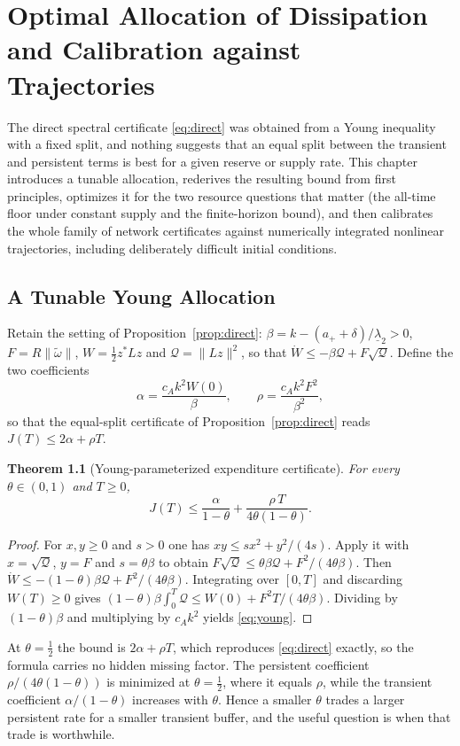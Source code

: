 \documentclass[11pt,notitlepage]{report}
\newtheorem{theorem}{Theorem}[chapter]
\theoremstyle{definition}
\theoremstyle{remark}
\begin{document}
\chapter{Optimal Allocation of Dissipation and Calibration against Trajectories}\label{ch:young}

The direct spectral certificate \eqref{eq:direct} was obtained from a Young inequality with a fixed split, and nothing suggests that an equal split between the transient and persistent terms is best for a given reserve or supply rate. This chapter introduces a tunable allocation, rederives the resulting bound from first principles, optimizes it for the two resource questions that matter (the all-time floor under constant supply and the finite-horizon bound), and then calibrates the whole family of network certificates against numerically integrated nonlinear trajectories, including deliberately difficult initial conditions.

\section{A Tunable Young Allocation}
Retain the setting of Proposition~\ref{prop:direct}: $\beta=k-(a_++\delta)/\underline\lambda_2>0$, $F=R\|\tilde\omega\|$, $W=\tfrac12z^*Lz$ and $\mathcal Q=\|Lz\|^2$, so that $\dot W\le-\beta\mathcal Q+F\sqrt{\mathcal Q}$. Define the two coefficients
\begin{equation}\label{eq:alpharho}
\alpha=\frac{c_Ak^2W(0)}{\beta},\qquad \rho=\frac{c_Ak^2F^2}{\beta^2},
\end{equation}
so that the equal-split certificate of Proposition~\ref{prop:direct} reads $J(T)\le2\alpha+\rho T$.
\begin{theorem}[Young-parameterized expenditure certificate]\label{th:young}
For every $\theta\in(0,1)$ and $T\ge0$,
\begin{equation}\label{eq:young}
J(T)\le\frac{\alpha}{1-\theta}+\frac{\rho\,T}{4\theta(1-\theta)}.
\end{equation}
\end{theorem}
\begin{proof}
For $x,y\ge0$ and $s>0$ one has $xy\le sx^2+y^2/(4s)$. Apply it with $x=\sqrt{\mathcal Q}$, $y=F$ and $s=\theta\beta$ to obtain $F\sqrt{\mathcal Q}\le\theta\beta\mathcal Q+F^2/(4\theta\beta)$. Then $\dot W\le-(1-\theta)\beta\mathcal Q+F^2/(4\theta\beta)$. Integrating over $[0,T]$ and discarding $W(T)\ge0$ gives $(1-\theta)\beta\int_0^T\mathcal Q\le W(0)+F^2T/(4\theta\beta)$. Dividing by $(1-\theta)\beta$ and multiplying by $c_Ak^2$ yields \eqref{eq:young}.
\end{proof}
At $\theta=\tfrac12$ the bound is $2\alpha+\rho T$, which reproduces \eqref{eq:direct} exactly, so the formula carries no hidden missing factor. The persistent coefficient $\rho/(4\theta(1-\theta))$ is minimized at $\theta=\tfrac12$, where it equals $\rho$, while the transient coefficient $\alpha/(1-\theta)$ increases with $\theta$. Hence a smaller $\theta$ trades a larger persistent rate for a smaller transient buffer, and the useful question is when that trade is worthwhile.
\end{document}
